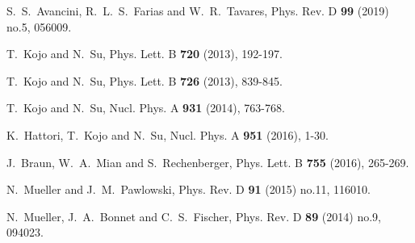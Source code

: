 \begin{thebibliography}{1000}
S.~S.~Avancini, R.~L.~S.~Farias and W.~R.~Tavares,
Phys. Rev. D \textbf{99} (2019) no.5, 056009.



T.~Kojo and N.~Su,
Phys. Lett. B \textbf{720} (2013), 192-197.

T.~Kojo and N.~Su,
Phys. Lett. B \textbf{726} (2013), 839-845.

T.~Kojo and N.~Su,
Nucl. Phys. A \textbf{931} (2014), 763-768.

K.~Hattori, T.~Kojo and N.~Su,
Nucl. Phys. A \textbf{951} (2016), 1-30.


J.~Braun, W.~A.~Mian and S.~Rechenberger,
Phys. Lett. B \textbf{755} (2016), 265-269.

N.~Mueller and J.~M.~Pawlowski,
Phys. Rev. D \textbf{91} (2015) no.11, 116010.

N.~Mueller, J.~A.~Bonnet and C.~S.~Fischer,
Phys. Rev. D \textbf{89} (2014) no.9, 094023.



\end{thebibliography}
